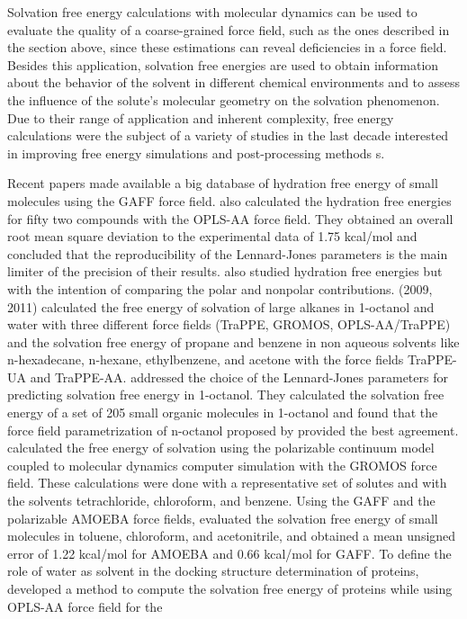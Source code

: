 Solvation free energy calculations with molecular dynamics can be used to evaluate the quality of a coarse-grained force field, such as the ones described in the section above, since these estimations can reveal deficiencies in a force field. Besides this application, solvation free energies are used to obtain information about the behavior of the solvent in different chemical environments and to assess the influence of the solute's molecular geometry on the solvation phenomenon. Due to their range of application and inherent complexity, free energy calculations were the subject of a variety of studies in the last decade interested in improving free energy simulations and post-processing methods \cite{mbar,bareva,dexp,gdel}s.

Recent papers \cite{PMID:24928188,mobley2017} made available a big database of hydration free energy of small molecules using the GAFF force field.  also calculated the hydration free energies for fifty two compounds with the OPLS-AA force field. They obtained an overall root mean square deviation to the experimental data of 1.75 kcal/mol and concluded that the reproducibility of the Lennard-Jones parameters is the main limiter of the precision of their results.  also studied hydration free energies but with the intention of comparing the polar and nonpolar contributions. \citeauthor{garrido2011} (2009, 2011) calculated the free energy of solvation of large alkanes in 1-octanol and water with three different force fields (TraPPE, GROMOS, OPLS-AA/TraPPE) and the solvation free energy of propane and benzene in non aqueous solvents like n-hexadecane, n-hexane, ethylbenzene, and acetone  with the force fields TraPPE-UA and TraPPE-AA.  addressed the choice of the Lennard-Jones parameters for predicting solvation free energy in 1-octanol. They calculated the solvation free energy of a set of 205 small organic molecules in 1-octanol and found that the force field parametrization of n-octanol proposed by  provided the best agreement.  calculated the free energy of solvation using the polarizable continuum model coupled to molecular dynamics computer simulation with the GROMOS force field. These calculations were done with a representative set of solutes and with the solvents tetrachloride, chloroform, and benzene. Using the GAFF and the polarizable AMOEBA force fields,  evaluated the solvation free energy of small molecules in toluene, chloroform, and acetonitrile, and obtained a mean unsigned error of 1.22 kcal/mol for AMOEBA and 0.66 kcal/mol for GAFF. To define the role of water as solvent in the docking structure determination of proteins,  developed a method to compute the solvation free energy of proteins while using OPLS-AA force field for the
